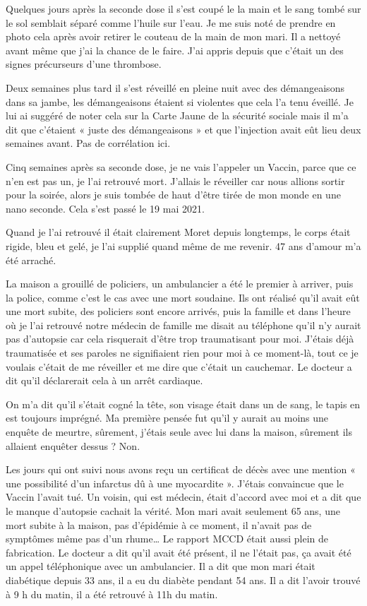 {Quelques jours après la seconde dose il s’est coupé le la main et le sang tombé sur le sol semblait séparé comme l’huile sur l’eau. Je me suis noté de prendre en photo cela après avoir retirer le couteau de la main de mon mari. Il a nettoyé avant même que j’ai la chance de le faire. J’ai appris depuis que c’était un des signes précurseurs d’une thrombose.

Deux semaines plus tard il s’est réveillé en pleine nuit avec des démangeaisons dans sa jambe, les démangeaisons étaient si violentes que cela l’a tenu éveillé. Je lui ai suggéré de noter cela sur la Carte Jaune de la sécurité sociale mais il m’a dit que c’étaient « juste des démangeaisons » et que l’injection avait eût lieu deux semaines avant. Pas de corrélation ici.

Cinq semaines après sa seconde dose, je ne vais l’appeler un Vaccin, parce que ce n’en est pas un, je l’ai retrouvé mort. J’allais le réveiller car nous allions sortir pour la soirée, alors je suis tombée de haut d’être tirée de mon monde en une nano seconde. Cela s’est passé le 19 mai 2021.

Quand je l’ai retrouvé il était clairement Moret depuis longtemps, le corps était rigide, bleu et gelé, je l’ai supplié quand même de me revenir. 47 ans d’amour m’a été arraché.

La maison a grouillé de policiers, un ambulancier a été le premier à arriver, puis la police, comme c’est le cas avec une mort soudaine. Ils ont réalisé qu’il avait eût une mort subite, des policiers sont encore arrivés, puis la famille et dans l’heure où je l’ai retrouvé notre médecin de famille me disait au téléphone qu’il n’y aurait pas d’autopsie car cela risquerait d’être trop traumatisant pour moi. J’étais déjà traumatisée et ses paroles ne signifiaient rien pour moi à ce moment-là, tout ce je voulais c’était de me réveiller et me dire que c’était un cauchemar. Le docteur a dit qu’il déclarerait cela à un arrêt cardiaque.

On m’a dit qu’il s’était cogné la tête, son visage était dans un de sang, le tapis en est toujours imprégné. Ma première pensée fut qu’il y aurait au moins une enquête de meurtre, sûrement, j’étais seule avec lui dans la maison, sûrement ils allaient enquêter dessus ? Non.

Les jours qui ont suivi nous avons reçu un certificat de décès avec une mention « une possibilité d’un infarctus dû à une myocardite ». J’étais convaincue que le Vaccin l’avait tué. Un voisin, qui est médecin, était d’accord avec moi et a dit que le manque d’autopsie cachait la vérité. Mon mari avait seulement 65 ans, une mort subite à la maison, pas d’épidémie à ce moment, il n’avait pas de symptômes même pas d’un rhume… Le rapport MCCD était aussi plein de fabrication. Le docteur a dit qu’il avait été présent, il ne l’était pas, ça avait été un appel téléphonique avec un ambulancier. Il a dit que mon mari était diabétique depuis 33 ans, il a eu du diabète pendant 54 ans. Il a dit l’avoir trouvé à 9 h du matin, il a été retrouvé à 11h du matin.

}
